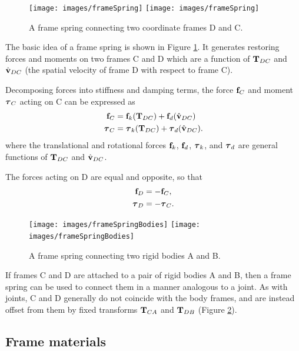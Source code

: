 \begin{figure}[ht]
\begin{center}
 \iflatexml
   \texttt{[image: images/frameSpring]}
 \else
   \texttt{[image: images/frameSpring]}
 \fi
\end{center}
\caption{A frame spring connecting two coordinate frames D and C.}
\label{frameSpring:fig}
\end{figure}

The basic idea of a frame spring is shown in Figure
\ref{frameSpring:fig}. It generates restoring forces and moments on
two frames C and D which are a function of ${\bf T}_{DC}$ and $\hat{{\bf v}}_{DC}$
(the spatial velocity of frame D with respect to frame C).

Decomposing forces into stiffness and damping terms, the force
${\bf f}_C$ and moment $\boldsymbol\tau_C$ acting on C can be expressed as 
%
\begin{align}
{\bf f}_C & = {\bf f}_{k} ({\bf T}_{DC}) + {\bf f}_{d} (\hat{{\bf v}}_{DC}) \notag \\
\boldsymbol\tau_C & = \boldsymbol\tau_{k} ({\bf T}_{DC}) + \boldsymbol\tau_{d} (\hat{{\bf v}}_{DC}).
\label{ftauC:eqn}
\end{align}
%
where the translational and rotational forces ${\bf f}_{k}$, ${\bf f}_{d}$,
$\boldsymbol\tau_{k}$, and $\boldsymbol\tau_{d}$ are general functions of ${\bf T}_{DC}$ and
$\hat{{\bf v}}_{DC}$.

The forces acting on D are equal and opposite, so that
%
\begin{align}
{\bf f}_D & = - {\bf f}_C, \notag \\
\boldsymbol\tau_D & = - \boldsymbol\tau_C.
\label{ftau2:eqn}
\end{align}
%

\begin{figure}[ht]
\begin{center}
 \iflatexml
   \texttt{[image: images/frameSpringBodies]}
 \else
   \texttt{[image: images/frameSpringBodies]}
 \fi
\end{center}
\caption{A frame spring connecting two rigid bodies A and B.}
\label{frameSpringBodies:fig}
\end{figure}

If frames C and D are attached to a pair of rigid bodies A and B, then
a frame spring can be used to connect them in a manner analogous to a
joint. As with joints, C and D generally do not coincide with the body
frames, and are instead offset from them by fixed transforms ${\bf T}_{CA}$
and ${\bf T}_{DB}$ (Figure \ref{frameSpringBodies:fig}).

\subsection{Frame materials}


